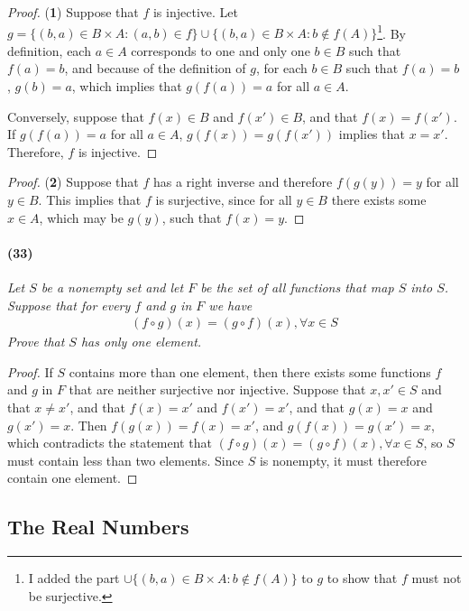 \begin{proof}(\textbf{1})
	Suppose that $f$ is injective. Let $g = \{(b,a)\in B\times A:(a,b)\in f\}\cup\{(b,a)\in B\times A:b\notin f(A)\}$\footnote{I added the part $\cup\{(b,a)\in B\times A:b\notin f(A)\}$ to $g$ to show that $f$ must not be surjective.}. By definition, each $a\in A$ corresponds to one and only one $b\in B$ such that $f(a)=b$, and because of the definition of $g$, for each $b\in B$ such that $f(a)=b$, $g(b)=a$, which implies that $g(f(a))=a$ for all $a\in A$. 
	
	Conversely, suppose that $f(x)\in B$ and $f(x')\in B$, and that $f(x)=f(x')$. If $g(f(a))=a$ for all $a\in A$, $g(f(x))=g(f(x'))$ implies that $x=x'$. Therefore, $f$ is injective.
\end{proof}

\begin{proof}(\textbf{2})
	Suppose that $f$ has a right inverse and therefore $f(g(y))=y$ for all $y\in B$. This implies that $f$ is surjective, since for all $y\in B$ there exists some $x\in A$, which may be $g(y)$, such that $f(x)=y$.
\end{proof}

\newpage
\paragraph{(33)}

\textit{Let $S$ be a nonempty set and let $F$ be the set of all functions that map $S$ into $S$. Suppose that for every $f$ and $g$ in $F$ we have
\begin{align*}
	(f\circ g)(x)=(g\circ f)(x), \forall x\in S
\end{align*}
Prove that $S$ has only one element.}

\begin{proof}
	If $S$ contains more than one element, then there exists some functions $f$ and $g$ in $F$ that are neither surjective nor injective. Suppose that $x,x'\in S$ and that $x\neq x'$, and that $f(x)=x'$ and $f(x')=x'$, and that $g(x)=x$ and $g(x')=x$. Then $f(g(x))=f(x)=x'$, and $g(f(x))=g(x')=x$, which contradicts the statement that $(f\circ g)(x)=(g\circ f)(x), \forall x\in S$, so $S$ must contain less than two elements. Since $S$ is nonempty, it must therefore contain one element.
\end{proof}

\newpage
\subsection{The Real Numbers}

